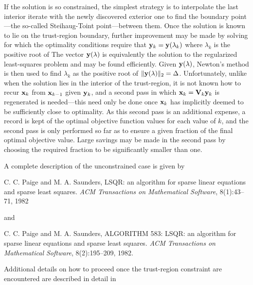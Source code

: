 \documentclass{galahad}
\begin{document}
If the solution is so constrained, the simplest strategy is to interpolate
the last interior iterate with the newly discovered exterior one to find the
boundary point---the so-called Steihaug-Toint point---between them.
Once the solution is known to lie on the trust-region boundary, 
further improvement may be made by solving
for which the optimality conditions require that ${\mathbf{y}}_k = {\mathbf{y}}(\lambda_k)$
where $\lambda_k$ is the positive root of
The vector ${\mathbf{y}}(\lambda)$ is equivalently the solution to the 
regularized least-squares problem 
and may be found efficiently. Given  ${\mathbf{y}}(\lambda)$, Newton's method
is then used to find $\lambda_k$ as the positive root of 
$\|{\mathbf{y}}(\lambda)\|_2 = \Delta$. Unfortunately, unlike when the solution 
lies in the interior of the trust-region, it is not known how to recur 
${\mathbf{x}}_k$ from ${\mathbf{x}}_{k-1}$ given ${\mathbf{y}}_k$, and a second pass in which 
${\mathbf{x}}_k = {\mathbf{V}}_k {\mathbf{y}}_k$ is regenerated is needed---this need only be done
once ${\mathbf{x}}_k$ has implicitly deemed to be sufficiently close to optimality.
As this second pass is an additional expense, a record is kept of the 
optimal objective function values for each value of $k$, and the second 
pass is only performed so far as to ensure a given fraction of the 
final optimal objective value. Large savings may be made in the second 
pass by choosing the required fraction to be significantly smaller than one. 
 
\galreferences
A complete description of the unconstrained case is given by
\vspace*{1mm}

\noindent  
C. C. Paige and M. A. Saunders,
LSQR: an algorithm for sparse linear equations and sparse least  squares.
{\em ACM Transactions on Mathematical Software}, 8(1):43--71, 1982

\noindent  
and

\noindent  
C. C. Paige and M. A. Saunders,
ALGORITHM 583: LSQR: an algorithm for sparse linear equations and
  sparse least squares.
{\em ACM Transactions on Mathematical Software}, 8(2):195--209, 1982.

\noindent  
Additional details on how to proceed once the trust-region constraint are 
encountered are described in detail in 
\vspace*{1mm}
\end{document}
